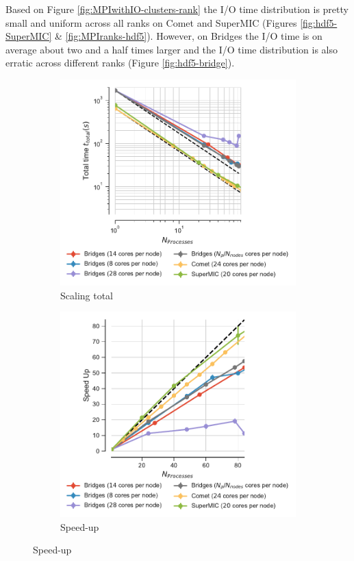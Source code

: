 Based on Figure \ref{fig:MPIwithIO-clusters-rank} the I/O time distribution is pretty small and uniform across all ranks on Comet and SuperMIC (Figures \ref{fig:hdf5-SuperMIC} \& \ref{fig:MPIranks-hdf5}).
However, on Bridges the I/O time is on average about two and a half times larger and the I/O time distribution is also erratic across different ranks (Figure \ref{fig:hdf5-bridge}).  

\begin{figure}[ht!]
\centering
\begin{subfigure}{.4\textwidth}
  \includegraphics[width=\linewidth]{figures/Comparison_t-tot-clusters.pdf}
  \caption{Scaling total}
  \label{fig:MPIscaling-clusters}
\end{subfigure}
\hfill
\begin{subfigure}{.4\textwidth}
  \includegraphics[width=\linewidth]{figures/Comparison_speed-up-clusters.pdf}
  \caption{Speed-up}
  \label{fig:MPIspeedup-clusters}
\end{subfigure}
\bigskip


\end{figure}

